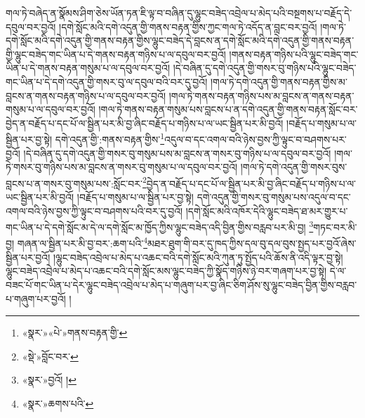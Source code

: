 གལ་ཏེ་བཞེད་ན་སྣོམས་ཤིག་ཅེས་ཡོན་ཏན་ཇི་ལྟ་བ་བཞིན་དུ་ལྷུང་བཟེད་འབྲེལ་པ་མེད་པའི་བསྔགས་པ་བརྗོད་དེ་དབུལ་བར་བྱའོ། །དགེ་སློང་མའི་དགེ་འདུན་གྱི་གནས་བརྟན་གྱིས་ཀྱང་གལ་ཏེ་འདོད་ན་བླང་བར་བྱའོ། །གལ་ཏེ་དགེ་སློང་མའི་དགེ་འདུན་གྱི་གནས་བརྟན་གྱིས་ལྷུང་བཟེད་དེ་བླངས་ན་དགེ་སློང་མའི་དགེ་འདུན་གྱི་གནས་བརྟན་གྱི་ལྷུང་བཟེད་གང་ཡིན་པ་དེ་གནས་བརྟན་གཉིས་པ་ལ་དབུལ་བར་བྱའོ། །གནས་བརྟན་གཉིས་པའི་ལྷུང་བཟེད་གང་ཡིན་པ་དེ་གནས་བརྟན་གསུམ་པ་ལ་དབུལ་བར་བྱའོ། །དེ་བཞིན་དུ་དགེ་འདུན་གྱི་གསར་བུ་གཉིས་པའི་ལྷུང་བཟེད་གང་ཡིན་པ་དེ་དགེ་འདུན་གྱི་གསར་བུ་ལ་དབུལ་བའི་བར་དུ་བྱའོ། །གལ་ཏེ་དགེ་འདུན་གྱི་གནས་བརྟན་གྱིས་མ་བླངས་ན་གནས་བརྟན་གཉིས་པ་ལ་དབུལ་བར་བྱའོ། །གལ་ཏེ་གནས་བརྟན་གཉིས་པས་མ་བླངས་ན་གནས་བརྟན་གསུམ་པ་ལ་དབུལ་བར་བྱའོ། །གལ་ཏེ་གནས་བརྟན་གསུམ་པས་བླངས་པ་ན་དགེ་འདུན་གྱི་གནས་བརྟན་སློང་བར་བྱེད་ན་བརྗོད་པ་དང་པོ་ལ་སྦྱིན་པར་མི་བྱ་ཞིང་བརྗོད་པ་གཉིས་པ་ལ་ཡང་སྦྱིན་པར་མི་བྱའོ། །བརྗོད་པ་གསུམ་པ་ལ་སྦྱིན་པར་བྱ་སྟེ། དགེ་འདུན་གྱི་:གནས་བརྟན་གྱིས་\footnote{«སྣར་»«པེ་»གནས་བརྟན་གྱི་}འདུལ་བ་དང་འགལ་བའི་ཉེས་བྱས་ཀྱི་ལྟུང་བ་བཤགས་པར་བྱའོ། །དེ་བཞིན་དུ་དགེ་འདུན་གྱི་གསར་བུ་གསུམ་པས་མ་བླངས་ན་གསར་བུ་གཉིས་པ་ལ་དབུལ་བར་བྱའོ། །གལ་ཏེ་གསར་བུ་གཉིས་པས་མ་བླངས་ན་གསར་བུ་གསུམ་པ་ལ་དབུལ་བར་བྱའོ། །གལ་ཏེ་དགེ་འདུན་གྱི་གསར་བུས་བླངས་པ་ན་གསར་བུ་གསུམ་པས་:སློང་བར་\footnote{«སྡེ་»བློང་བར་}བྱེད་ན་བརྗོད་པ་དང་པོ་ལ་སྦྱིན་པར་མི་བྱ་ཞིང་བརྗོད་པ་གཉིས་པ་ལ་ཡང་སྦྱིན་པར་མི་བྱའོ། །བརྗོད་པ་གསུམ་པ་ལ་སྦྱིན་པར་བྱ་སྟེ། དགེ་འདུན་གྱི་གསར་བུ་གསུམ་པས་འདུལ་བ་དང་འགལ་བའི་ཉེས་བྱས་ཀྱི་ལྟུང་བ་བཤགས་པའི་བར་དུ་བྱའོ། །དགེ་སློང་མའི་འཁོར་དེའི་ལྷུང་བཟེད་ཐ་མར་གྱུར་པ་གང་ཡིན་པ་དེ་དགེ་སློང་མ་དེ་ལ་དགེ་སློང་མ་ཁྱོད་ཀྱིས་ལྷུང་བཟེད་འདི་བྱིན་གྱིས་བརླབ་པར་མི་བྱ། \footnote{«སྣར་»བྱའོ། ། }གཏང་བར་མི་བྱ། གཞན་ལ་སྦྱིན་པར་མི་བྱ་བར་:ཆག་པའི་\footnote{«སྣར་»ཆགས་པའི་}མཐར་ཐུག་གི་བར་དུ་ཁད་ཀྱིས་དལ་བུ་དལ་བུས་སྤྱད་པར་བྱའོ་ཞེས་སྦྱིན་པར་བྱའོ། །ལྷུང་བཟེད་འབྲེལ་པ་མེད་པ་འཆང་བའི་དགེ་སློང་མའི་ཀུན་ཏུ་སྤྱོད་པའི་ཆོས་ནི་འདི་ལྟར་བྱ་སྟེ། ལྷུང་བཟེད་འབྲེལ་པ་མེད་པ་འཆང་བའི་དགེ་སློང་མས་ལྷུང་བཟེད་ཀྱི་སྣོད་གཉིས་ཉེ་བར་གཞག་པར་བྱ་སྟེ། དེ་ལ་བཟང་པོ་གང་ཡིན་པ་དེར་ལྷུང་བཟེད་འབྲེལ་པ་མེད་པ་གཞུག་པར་བྱ་ཞིང་ཅིག་ཤོས་སུ་ལྷུང་བཟེད་བྱིན་གྱིས་བརླབ་པ་གཞུག་པར་བྱའོ། །
